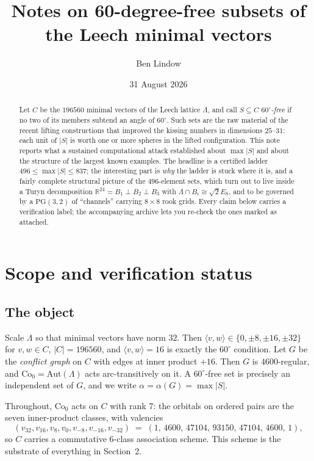 \documentclass[10pt,a4paper]{article}
\title{Notes on 60-degree-free subsets of the Leech minimal vectors}
\author{Ben Lindow}
\date{31 August 2026}
\newcommand{\Lam}{\Lambda}
\newcommand{\Co}{\mathrm{Co}_0}
\newcommand{\ip}[2]{\langle #1,#2\rangle}
\begin{document}
\maketitle

\begin{abstract}
\noindent
Let $C$ be the $196560$ minimal vectors of the Leech lattice $\Lam$, and call
$S \subseteq C$ \emph{$60^\circ$-free} if no two of its members subtend an angle of
$60^\circ$. Such sets are the raw material of the recent lifting constructions that
improved the kissing numbers in dimensions $25$--$31$: each unit of $|S|$ is worth one or
more spheres in the lifted configuration. This note reports what a sustained computational
attack established about $\max|S|$ and about the structure of the largest known examples.
The headline is a certified ladder $496 \le \max|S| \le 837$; the interesting part is
\emph{why} the ladder is stuck where it is, and a fairly complete structural picture of the
$496$-element sets, which turn out to live inside a Turyn decomposition
$\mathbb{R}^{24} = B_1 \perp B_2 \perp B_3$ with $\Lam \cap B_i \cong \sqrt{2}E_8$, and to be
governed by a $\mathrm{PG}(3,2)$ of ``channels'' carrying $8\times 8$ rook grids.
Every claim below carries a verification label; the accompanying archive lets you
re-check the ones marked as attached.
\end{abstract}

\section{Scope and verification status}

\subsection{The object}

Scale $\Lam$ so that minimal vectors have norm $32$. Then $\ip{v}{w} \in \{0,\pm 8,\pm 16,\pm 32\}$
for $v,w \in C$, $|C| = 196560$, and $\ip{v}{w} = 16$ is exactly the $60^\circ$ condition.
Let $G$ be the \emph{conflict graph} on $C$ with edges at inner product $+16$. Then $G$ is
$4600$-regular, and $\Co = \mathrm{Aut}(\Lam)$ acts arc-transitively on it. A $60^\circ$-free
set is precisely an independent set of $G$, and we write $\alpha = \alpha(G) = \max |S|$.

Throughout, $\Co$ acts on $C$ with rank $7$: the orbitals on ordered pairs are the seven
inner-product classes, with valencies
\[
  (v_{32},v_{16},v_8,v_0,v_{-8},v_{-16},v_{-32}) \;=\; (1,\,4600,\,47104,\,93150,\,47104,\,4600,\,1),
\]
so $C$ carries a commutative $6$-class association scheme. This scheme is the substrate of
everything in Section~2.
\end{document}
